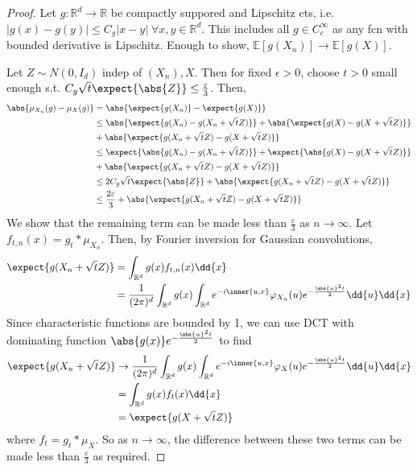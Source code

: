 \begin{proof}
	Let $g : \mathbb{R}^d \to \mathbb{R}$ be compactly suppored and Lipschitz cts, i.e. $|g(x) - g(y)| \leq C_g |x-y| \; \forall x, y \in \mathbb{R}^d$.
	This includes all $g \in C_c^\infty$ as any fcn with bounded derivative is Lipschitz.
	Enough to show, $\mathbb{E}[g(X_n)] \to \mathbb{E}[g(X)]$.

	Let $Z \sim N(0, I_d)$ indep of $(X_n), X$.
	Then for fixed $\epsilon > 0$, choose $t > 0$ small enough s.t. $C_g \sqrt t \expect{\abs{Z}} \leq \frac{\varepsilon}{3}$.
	Then,
	\begin{align*}
		\abs{\mu_{X_n}(g) - \mu_X(g)} &= \abs{\expect{g(X_n)} - \expect{g(X)}} \\
		&\leq \abs{\expect{g(X_n) - g(X_n + \sqrt t Z)}} + \abs{\expect{g(X) - g(X + \sqrt t Z)}} \\
		&+ \abs{\expect{g(X_n + \sqrt t Z) - g(X + \sqrt t Z)}} \\
		&\leq \expect{\abs{g(X_n) - g(X_n + \sqrt t Z)}} + \expect{\abs{g(X) - g(X + \sqrt t Z)}} \\
		&+ \abs{\expect{g(X_n + \sqrt t Z) - g(X + \sqrt t Z)}} \\
		&\leq 2 C_g \sqrt t \expect{\abs{Z}} + \abs{\expect{g(X_n + \sqrt t Z) - g(X + \sqrt t Z)}} \\
		&\leq \frac{2\varepsilon}{3} + \abs{\expect{g(X_n + \sqrt t Z) - g(X + \sqrt t Z)}}
	\end{align*}
	We show that the remaining term can be made less than $\frac{\varepsilon}{3}$ as $n \to \infty$.
	Let $f_{t,n}(x) = g_t \ast \mu_{X_n}$.
	Then, by Fourier inversion for Gaussian convolutions,
	\begin{align*}
		\expect{g(X_n + \sqrt t Z)} &= \int_{\mathbb R^d} g(x) f_{t,n}(x) \dd{x} \\
		&= \frac{1}{(2\pi)^d} \int_{\mathbb R^d} g(x) \int_{\mathbb R^d} e^{-i\inner{u,x}} \varphi_{X_n}(u) e^{-\frac{\abs{u}^2 t}{2}} \dd{u} \dd{x}
	\end{align*}
	Since characteristic functions are bounded by 1, we can use DCT with dominating function $\abs{g(x)} e^{-\frac{\abs{u}^2 t}{2}}$ to find
	\begin{align*}
		\expect{g(X_n + \sqrt t Z)} &\to \frac{1}{(2\pi)^d} \int_{\mathbb R^d} g(x) \int_{\mathbb R^d} e^{-i\inner{u,x}} \varphi_X(u) e^{-\frac{\abs{u}^2 t}{2}} \dd{u} \dd{x} \\
		&= \int_{\mathbb R^d} g(x) f_t(x) \dd{x} \\
		&= \expect{g(X + \sqrt t Z)}
	\end{align*}
	where $f_t = g_t \ast \mu_X$.
	So as $n \to \infty$, the difference between these two terms can be made less than $\frac{\varepsilon}{3}$ as required.
\end{proof}

